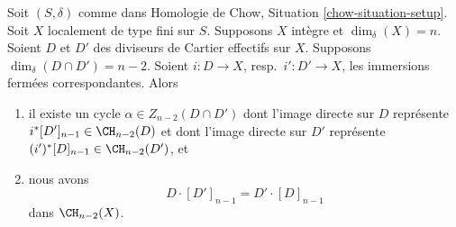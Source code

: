 \begin{lemma}
\label{lemma-commutativity-effective-Cartier-proper-intersection}
Soit $(S, \delta)$ comme dans Homologie de Chow, Situation \ref{chow-situation-setup}.
Soit $X$ localement de type fini sur $S$.
Supposons $X$ intègre et $\dim_\delta(X) = n$.
Soient $D$ et $D'$ des diviseurs de Cartier effectifs sur $X$.
Supposons $\dim_\delta(D \cap D') = n - 2$. Soient $i : D \to X$,
resp.\ $i' : D' \to X$, les immersions fermées correspondantes.
Alors
\begin{enumerate}
\item il existe un cycle $\alpha \in Z_{n - 2}(D \cap D')$
dont l'image directe sur $D$ représente
$i^*[D']_{n - 1} \in \CH_{n - 2}(D)$
et dont l'image directe sur $D'$ représente
$(i')^*[D]_{n - 1} \in \CH_{n - 2}(D')$, et
\item nous avons
$$
D \cdot [D']_{n - 1}
=
D' \cdot [D]_{n - 1}
$$
dans $\CH_{n - 2}(X)$.
\end{enumerate}
\end{lemma}

